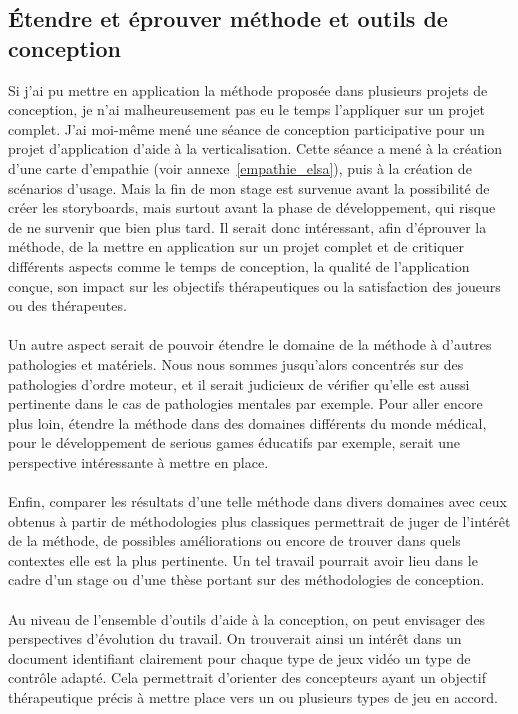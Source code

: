 	\subsection{Étendre et éprouver méthode et outils de conception}
Si j'ai pu mettre en application la méthode proposée dans plusieurs projets de conception, je n'ai malheureusement pas eu le temps l'appliquer sur un projet complet. J'ai  moi-même mené une séance de conception participative pour un projet d'application d'aide à la verticalisation. Cette séance a mené à la création d'une carte d'empathie (voir annexe~\ref{empathie_elsa}), puis à la création de scénarios d'usage. Mais la fin de mon stage est survenue avant la possibilité de créer les storyboards, mais surtout avant la phase de développement, qui risque de ne survenir que bien plus tard. Il serait donc intéressant, afin d'éprouver la méthode, de la mettre en application sur un projet complet et de critiquer différents aspects comme le temps de conception, la qualité de l'application conçue, son impact sur les objectifs thérapeutiques ou la satisfaction des joueurs ou des thérapeutes.

\paragraph{}
Un autre aspect serait de pouvoir étendre le domaine de la méthode à d'autres pathologies et matériels. Nous nous sommes jusqu'alors concentrés sur des pathologies d'ordre moteur, et il serait judicieux de vérifier qu'elle est aussi pertinente dans le cas de pathologies mentales par exemple. Pour aller encore plus loin, étendre la méthode dans des domaines différents du monde médical, pour le développement de serious games éducatifs par exemple, serait une perspective intéressante à mettre en place.

\paragraph{} Enfin, comparer les résultats d'une telle méthode dans divers domaines avec ceux obtenus à partir de méthodologies plus classiques permettrait de juger de l'intérêt de la méthode, de possibles améliorations ou encore de trouver dans quels contextes elle est la plus pertinente. Un tel travail pourrait avoir lieu dans le cadre d'un stage ou d'une thèse portant sur des méthodologies de conception.

\paragraph{} Au niveau de l'ensemble d'outils d'aide à la conception, on peut envisager des perspectives d'évolution du travail. On trouverait ainsi un intérêt dans un document identifiant clairement pour chaque type de jeux vidéo un type de contrôle adapté. Cela permettrait d'orienter des concepteurs ayant un objectif thérapeutique précis à mettre place vers un ou plusieurs types de jeu en accord.

